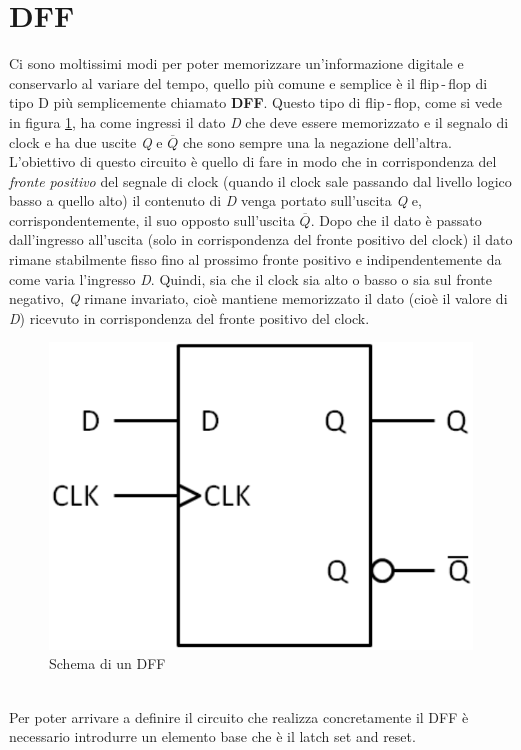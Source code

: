 \documentclass[12pt, a4paper]{report}
\begin{document}
\section{DFF}
Ci sono moltissimi modi per poter memorizzare un'informazione digitale e conservarlo al variare del tempo, quello più comune e semplice è il flip\,-\,flop di tipo D più semplicemente chiamato \textbf{DFF}. Questo tipo di flip\,-\,flop, come si vede in figura \ref{dff}, ha come ingressi il dato \textit{D} che deve essere memorizzato e il segnalo di clock e ha due uscite \textit{Q} e $\overline{Q}$ che sono sempre una la negazione dell'altra. L'obiettivo di questo circuito è quello di fare in modo che in corrispondenza del \textit{fronte positivo} del segnale di clock (quando il clock sale passando dal livello logico basso a quello alto) il contenuto di \textit{D} venga portato sull'uscita \textit{Q} e, corrispondentemente, il suo opposto sull'uscita $\overline{Q}$. Dopo che il dato è passato dall'ingresso all'uscita (solo in corrispondenza del fronte positivo del clock) il dato rimane stabilmente fisso fino al prossimo fronte positivo e indipendentemente da come varia l'ingresso \textit{D}. Quindi, sia che il clock sia alto o basso o sia sul fronte negativo, \textit{Q} rimane invariato, cioè mantiene memorizzato il dato (cioè il valore di \textit{D}) ricevuto in corrispondenza del fronte positivo del clock.
\begin{figure}[h]
    \centering
    \includegraphics[scale=0.4,angle=0]{dff.png}
    \caption{Schema di un DFF}
    \label{dff}
\end{figure}
\\Per poter arrivare a definire il circuito che realizza concretamente il DFF è necessario introdurre un elemento base che è il latch set and reset.
\end{document}
